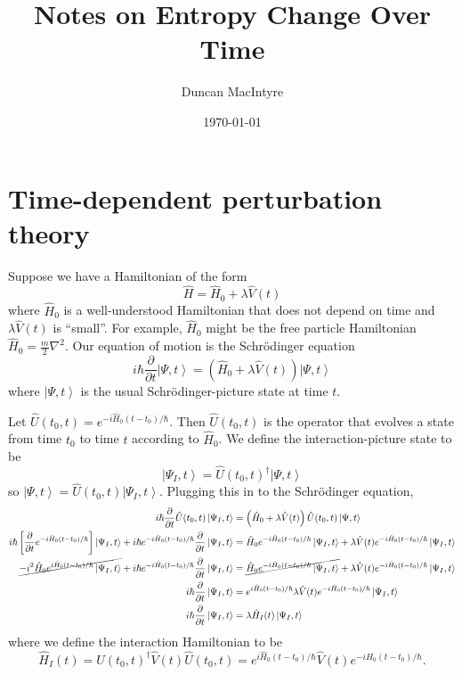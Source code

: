 \documentclass[11pt]{article}
\newcommand{\ket}[1]{\left|#1\right\rangle}
\newcommand{\op}[1]{\hat{#1}}
\theoremstyle{theorem}
\theoremstyle{remark}
\theoremstyle{step}
\theoremstyle{gap}
\begin{document}
\title{Notes on Entropy Change Over Time}
\author{Duncan MacIntyre}
\date{\today}
\maketitle
\tableofcontents
\bigskip
\newpage

\section{Time-dependent perturbation theory}

Suppose we have a Hamiltonian of the form \[\op{H} = \op{H}_0 + \lambda \op{V}(t)\]
where \(\op{H}_0\) is a well-understood Hamiltonian that does not depend on time and \(\lambda \op{V}(t)\) is ``small''. For example, \(\op{H}_0\) might be the free particle Hamiltonian \(\op{H}_0 = \frac{m}{2} \nabla^2\). Our equation of motion is the Schr\"odinger equation
\[i \hbar \frac{\partial}{\partial t} \ket{\Psi, t} = \left(\op{H}_0 + \lambda\op{V}(t)\right) \ket{\Psi, t}\]
where \(\ket{\Psi, t}\) is the usual Schr\"odinger-picture state at time \(t\).

Let \(\op{U}(t_0, t) = e^{-i\op{H}_0(t-t_0)/\hbar}\). Then \(\op{U}(t_0, t)\) is the operator that evolves a state from time \(t_0\) to time \(t\) according to \(\op{H}_0\). We define the interaction-picture state to be
\[\ket{\Psi_I, t} = \op{U}(t_0, t)^\dagger \ket{\Psi, t}\]
so \(\ket{\Psi, t} = \op{U}(t_0, t) \ket{\Psi_I, t}\).
Plugging this in to the Schr\"odinger equation,
\begin{align*}
i \hbar \frac{\partial}{\partial t} \op{U}(t_0, t)\ket{\Psi_I, t} &= \left(\op{H}_0 + \lambda \op{V}(t)\right) \op{U}(t_0, t)\ket{\Psi, t} \\
i \hbar \left[\frac{\partial}{\partial t} e^{-i\op{H}_0(t-t_0)/\hbar}\right] \ket{\Psi_I, t} + i \hbar e^{-i\op{H}_0(t-t_0)/\hbar} \frac{\partial}{\partial t} \ket{\Psi_I, t} &= \op{H}_0 e^{-i\op{H}_0(t-t_0)/\hbar}\ket{\Psi_I, t} + \lambda\op{V}(t) e^{-i\op{H}_0(t-t_0)/\hbar}\ket{\Psi_I, t} \\
\cancel{-i^2 \op{H}_0 e^{i\op{H}_0(t-t_0)/\hbar} \ket{\Psi_I, t}} + i \hbar e^{-i\op{H}_0(t-t_0)/\hbar} \frac{\partial}{\partial t} \ket{\Psi_I, t} &= \cancel{\op{H}_0 e^{-i\op{H}_0(t-t_0)/\hbar}\ket{\Psi_I, t}} + \lambda\op{V}(t) e^{-i\op{H}_0(t-t_0)/\hbar}\ket{\Psi_I, t} \\
 i \hbar \frac{\partial}{\partial t} \ket{\Psi_I, t} &= e^{i\op{H}_0(t-t_0)/\hbar}\lambda\op{V}(t) e^{-i\op{H}_0(t-t_0)/\hbar}\ket{\Psi_I, t} \\
 i \hbar \frac{\partial}{\partial t} \ket{\Psi_I, t} &= \lambda\op{H}_I(t)\ket{\Psi_I, t}
\end{align*}
where we define the interaction Hamiltonian to be
\[\op{H}_I(t) = \op{U}(t_0, t)^\dagger \op{V}(t)\op{U}(t_0, t) = e^{i\op{H}_0(t-t_0)/\hbar}\op{V}(t) e^{-i\op{H}_0(t-t_0)/\hbar}.\]
\end{document}
